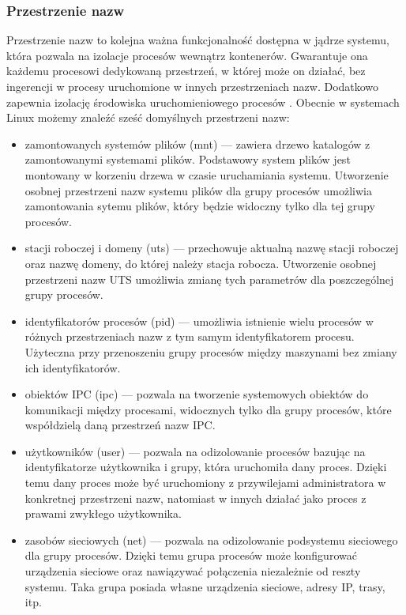 \documentclass[12pt]{report}
\let\Oldsubsubsection\subsubsection
\renewcommand{\subsubsection}{\FloatBarrier\Oldsubsubsection}
\begin{document}
\subsubsection{Przestrzenie nazw}
Przestrzenie nazw to kolejna ważna funkcjonalność dostępna w jądrze systemu, która pozwala na izolacje procesów wewnątrz kontenerów. Gwarantuje ona każdemu procesowi dedykowaną przestrzeń, w której może on działać, bez ingerencji w procesy uruchomione w innych przestrzeniach nazw. Dodatkowo zapewnia izolację środowiska uruchomieniowego procesów \cite{linux}. Obecnie w systemach Linux możemy znaleźć sześć domyślnych przestrzeni nazw:
\begin{itemize}
\item zamontowanych systemów plików (mnt) --- zawiera drzewo katalogów z zamontowanymi systemami plików. Podstawowy system plików jest montowany w korzeniu drzewa w czasie uruchamiania systemu. Utworzenie osobnej przestrzeni nazw systemu plików dla grupy procesów umożliwia zamontowania sytemu plików, który będzie widoczny tylko dla tej grupy procesów. 

\item stacji roboczej i domeny (uts) --- przechowuje aktualną nazwę stacji roboczej oraz nazwę domeny, do której należy stacja robocza. Utworzenie osobnej przestrzeni nazw UTS umożliwia zmianę tych parametrów dla poszczególnej grupy procesów.

\item identyfikatorów procesów (pid) --- umożliwia istnienie wielu procesów w różnych przestrzeniach nazw z tym samym identyfikatorem procesu. Użyteczna przy przenoszeniu grupy procesów między maszynami bez zmiany ich identyfikatorów.

\item obiektów IPC (ipc) --- pozwala na tworzenie systemowych obiektów do komunikacji między procesami, widocznych tylko dla grupy procesów, które współdzielą daną przestrzeń nazw IPC.

\item użytkowników (user) --- pozwala na odizolowanie procesów bazując na identyfikatorze użytkownika i grupy, która uruchomiła dany proces. Dzięki temu dany proces może być uruchomiony z przywilejami administratora w konkretnej przestrzeni nazw, natomiast w innych działać jako proces z prawami zwykłego użytkownika.

\item zasobów sieciowych (net) --- pozwala na odizolowanie podsystemu sieciowego dla grupy procesów. Dzięki temu grupa procesów może konfigurować urządzenia sieciowe oraz nawiązywać połączenia niezależnie od reszty systemu. Taka grupa posiada własne urządzenia sieciowe, adresy IP, trasy, itp.
\end{itemize}
\end{document}
